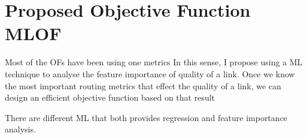 \section{Proposed Objective Function MLOF}

Most of the OFs have been using one metrics 
In this sense, I propose using a ML technique to analyse the feature importance of quality of a link. Once we know the most important routing metrics that effect the quality of a link, we can design an efficient objective function based on that result

There are different ML that both provides regression and feature importance analysis.
